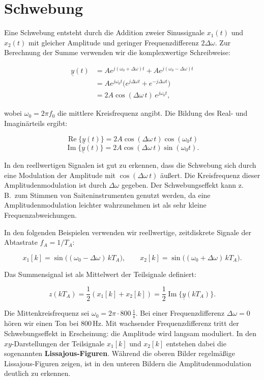 \section{Schwebung}
\label{sec:schwebung}

\begin{beispiel}[Schwebung]
Eine Schwebung entsteht durch die Addition zweier Sinussignale $x_1(t)$ und $x_2(t)$ mit gleicher Amplitude und geringer Frequenzdifferenz $2\Delta\omega$. Zur Berechnung der Summe verwenden wir die komplexwertige Schreibweise:

$$
\begin{aligned}
\underline{y}(t) &= A e^{j(\omega_0+\Delta\omega)t} + A e^{j(\omega_0-\Delta\omega)t} \\
                 &= A e^{j\omega_0 t} \bigl( e^{j\Delta\omega t} + e^{-j\Delta\omega t} \bigr) \\
                 &= 2A \cos(\Delta\omega\, t)\, e^{j\omega_0 t},
\end{aligned}
$$

wobei $\omega_0 = 2\pi f_0$ die mittlere Kreisfrequenz angibt. Die Bildung des Real- und Imaginärteils ergibt:

$$
\operatorname{Re}\{\underline{y}(t)\} = 2A\cos(\Delta\omega\, t)\cos(\omega_0 t)
$$
$$
\operatorname{Im}\{\underline{y}(t)\} = 2A\cos(\Delta\omega\, t)\sin(\omega_0 t).
$$

In den reellwertigen Signalen ist gut zu erkennen, dass die Schwebung sich durch eine Modulation der Amplitude mit $\cos(\Delta\omega\, t)$ äußert. Die Kreisfrequenz dieser Amplitudenmodulation ist durch $\Delta\omega$ gegeben. Der Schwebungseffekt kann z.\,B.\ zum Stimmen von Saiteninstrumenten genutzt werden, da eine Amplitudenmodulation leichter wahrzunehmen ist als sehr kleine Frequenzabweichungen.

In den folgenden Beispielen verwenden wir reellwertige, zeitdiskrete Signale der Abtastrate $f_A = 1/T_A$:

$$
x_1[k] = \sin\bigl((\omega_0 - \Delta\omega)\,k T_A\bigr), \qquad
x_2[k] = \sin\bigl((\omega_0 + \Delta\omega)\,k T_A\bigr).
$$

Das Summensignal ist als Mittelwert der Teilsignale definiert:

$$
z(k T_A) = \frac{1}{2}(x_1[k] + x_2[k]) = \frac{1}{2}\operatorname{Im}\{\underline{y}(k T_A)\}.
$$

Die Mittenkreisfrequenz sei $\omega_0 = 2\pi \cdot 800\,\frac{1}{\text{s}}$. Bei einer Frequenzdifferenz $\Delta\omega = 0$ hören wir einen Ton bei 800\,Hz. Mit wachsender Frequenzdifferenz tritt der Schwebungseffekt in Erscheinung: die Amplitude wird langsam moduliert. In den $xy$-Darstellungen der Teilsignale $x_1[k]$ und $x_2[k]$ entstehen dabei die sogenannten \textbf{Lissajous-Figuren}. Während die oberen Bilder regelmäßige Lissajous-Figuren zeigen, ist in den unteren Bildern die Amplitudenmodulation deutlich zu erkennen.


\end{beispiel}
